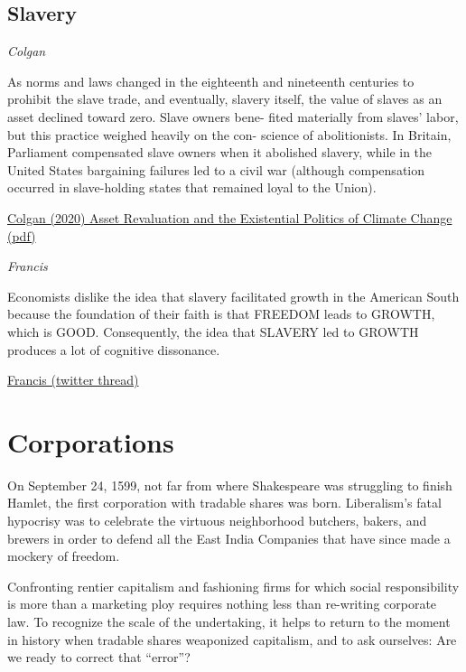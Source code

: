\documentclass[
]{book}
\begin{document}
\hypertarget{slavery}{%
\subsection{Slavery}\label{slavery}}

\emph{Colgan}

As norms and laws changed in the
eighteenth and nineteenth centuries to prohibit the slave trade, and eventually,
slavery itself, the value of slaves as an asset declined toward zero. Slave owners bene-
fited materially from slaves' labor, but this practice weighed heavily on the con-
science of abolitionists. In Britain, Parliament compensated slave owners when it
abolished slavery, while in the United States bargaining failures led to a civil war
(although compensation occurred in slave-holding states that remained loyal to the
Union).

\href{https://www.cambridge.org/core/journals/international-organization/article/asset-revaluation-and-the-existential-politics-of-climate-change/0963988860A37F6988E73738EA93E0A1\#}{Colgan (2020) Asset Revaluation and the Existential Politics of Climate Change}
\href{pdf/Colgan_2020_Asset_Climate_Politics.pdf}{(pdf)}

\emph{Francis}

Economists dislike the idea that slavery facilitated growth in the American South because the foundation of their faith is that FREEDOM leads to GROWTH, which is GOOD. Consequently, the idea that SLAVERY led to GROWTH produces a lot of cognitive dissonance.

\href{https://twitter.com/joefrancis505/status/1396416084174065671}{Francis (twitter thread)}

\hypertarget{corporations-1}{%
\section{Corporations}\label{corporations-1}}

On September 24, 1599, not far from where Shakespeare was struggling to finish Hamlet, the first corporation with tradable shares was born. Liberalism's fatal hypocrisy was to celebrate the virtuous neighborhood butchers, bakers, and brewers in order to defend all the East India Companies that have since made a mockery of freedom.

Confronting rentier capitalism and fashioning firms for which social responsibility is more than a marketing ploy requires nothing less than re-writing corporate law. To recognize the scale of the undertaking, it helps to return to the moment in history when tradable shares weaponized capitalism, and to ask ourselves: Are we ready to correct that ``error''?
\end{document}
